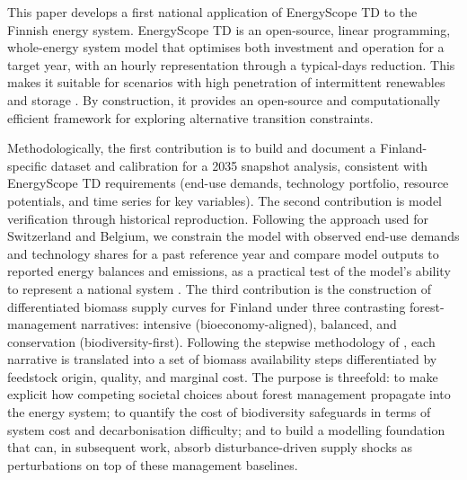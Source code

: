 \documentclass{article}
\begin{document}
This paper develops a first national application of EnergyScope TD to the Finnish energy system. EnergyScope TD is an open-source, linear programming, whole-energy system model that optimises both investment and operation for a target year, with an hourly representation through a typical-days reduction. This makes it suitable for scenarios with high penetration of intermittent renewables and storage \citep{limpensEnergyScopeTDNovel2019,limpensEnergyScopePathwayOpensource2024}. By construction, it provides an open-source and computationally efficient framework for exploring alternative transition constraints.

Methodologically, the first contribution is to build and document a Finland-specific dataset and calibration for a 2035 snapshot analysis, consistent with EnergyScope TD requirements (end-use demands, technology portfolio, resource potentials, and time series for key variables). The second contribution is model verification through historical reproduction. Following the approach used for Switzerland and Belgium, we constrain the model with observed end-use demands and technology shares for a past reference year and compare model outputs to reported energy balances and emissions, as a practical test of the model's ability to represent a national system \citep{moretCharacterizationInputUncertainties2017,thiranExploringOptionsFossilfree2025,limpensGeneratingEnergyTransition2021}. The third contribution is the construction of differentiated biomass supply curves for Finland under three contrasting forest-management narratives: intensive (bioeconomy-aligned), balanced, and conservation (biodiversity-first). Following the stepwise methodology of \citet{collaOptimalUseLignocellulosic2022}, each narrative is translated into a set of biomass availability steps differentiated by feedstock origin, quality, and marginal cost. The purpose is threefold: to make explicit how competing societal choices about forest management propagate into the energy system; to quantify the cost of biodiversity safeguards in terms of system cost and decarbonisation difficulty; and to build a modelling foundation that can, in subsequent work, absorb disturbance-driven supply shocks as perturbations on top of these management baselines.
\end{document}

